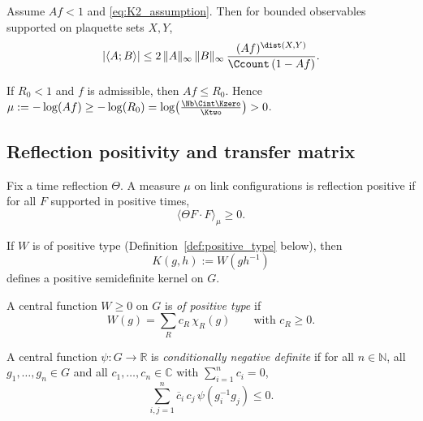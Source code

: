 \begin{theorem}\label{thm:clustering}
Assume $Af<1$ and \eqref{eq:K2_assumption}.
Then for bounded observables supported on plaquette sets $X,Y$,
\begin{equation}\label{eq:cluster_bound}
|\langle A;B\rangle|
\le
2\,\|A\|_{\infty}\,\|B\|_{\infty}\,\frac{(Af)^{\dist(X,Y)}}{\Ccount\,(1-Af)}.
\end{equation}
\end{theorem}

\begin{corollary}\label{cor:mu_from_R0}
If $R_0<1$ and $f$ is admissible, then $Af\le R_0$.
Hence $\mu:=-\log(Af)\ge -\log(R_0)=\log\bigl(\tfrac{\Nb\Cint\Kzero}{\Ktwo}\bigr)>0$.
\end{corollary}

\subsection{Reflection positivity and transfer matrix}

\begin{definition}
Fix a time reflection $\Theta$.
A measure $\mu$ on link configurations is reflection positive if for all $F$ supported in positive times,
\begin{equation}\label{eq:RP_def}
\langle \Theta F\cdot F\rangle_{\mu}\ge 0.
\end{equation}
\end{definition}

\begin{lemma}\label{lem:pos_kernel}
If $W$ is of positive type (Definition~\ref{def:positive_type} below), then
\[
K(g,h):=W(gh^{-1})
\]
defines a positive semidefinite kernel on $G$.
\end{lemma}

\begin{definition}\label{def:positive_type}
A central function $W\ge 0$ on $G$ is \emph{of positive type} if
\[
W(g)=\sum_R c_R\,\chi_R(g)
\qquad\text{with }c_R\ge 0.
\]
\end{definition}

\begin{definition}
A central function $\psi:G\to\mathbb R$ is \emph{conditionally negative definite} if for all $n\in\mathbb N$, all $g_1,\dots,g_n\in G$ and all $c_1,\dots,c_n\in\mathbb C$ with $\sum_{i=1}^n c_i=0$,
\[
\sum_{i,j=1}^n \overline c_i\,c_j\,\psi(g_i^{-1}g_j)\le 0.
\]
\end{definition}

